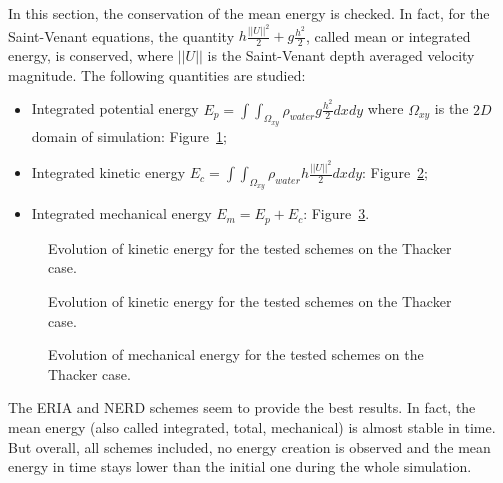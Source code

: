 In this section, the conservation of the mean energy is checked. In fact, for the Saint-Venant equations,
the quantity $h \frac{||U||^2}{2} + g \frac{h^2}{2}$, called mean or integrated energy, is conserved,
where $||U||$ is the Saint-Venant depth averaged velocity magnitude.
The following quantities are studied:
\begin{itemize}
\item Integrated potential energy \textbf{$E_p =\int\int_{\Omega_{xy}}\rho_{water} g \frac{h^2}{2} dxdy$} where $\Omega_{xy}$ is the $2D$ domain of simulation: Figure~\ref{fig:thacker:Ep};
\item Integrated kinetic energy \textbf{$E_c =\int\int_{\Omega_{xy}} \rho_{water} h \frac{||U||^2}{2} dxdy$}: Figure~\ref{fig:thacker:Ec};
\item Integrated mechanical energy \textbf{$E_m = E_p + E_c$}: Figure~\ref{fig:thacker:Em}.
\end{itemize}

\begin{figure}[H]
\centering
  \caption{Evolution of kinetic energy for the tested schemes on the Thacker case.}
\label{fig:thacker:Ep}
\end{figure}

\begin{figure}[H]
\centering
  \caption{Evolution of kinetic energy for the tested schemes on the Thacker case.}
\label{fig:thacker:Ec}
\end{figure}

\begin{figure}[H]
\centering
  \caption{Evolution of mechanical energy for the tested schemes on the Thacker case.}
\label{fig:thacker:Em}
\end{figure}

The ERIA and NERD schemes seem to provide the best results.
In fact, the mean energy (also called integrated, total, mechanical) is almost stable in time.
But overall, all schemes included, no energy creation is observed 
and the mean energy in time stays lower than the initial one during the whole simulation.

